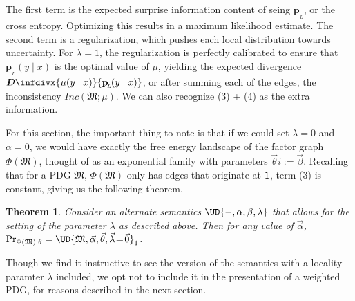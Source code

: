 \documentclass{article}
\theoremstyle{plain}
\newtheorem{theorem}{Theorem}[section]
\theoremstyle{definition}
\theoremstyle{remark}
\newcommand{\thickD}{I\mkern-8muD}
\newcommand{\kldiv}{\thickD\infdivx}%
\newcommand\mat[1]{\mathbf{#1}}
\newcommand{\bp}[1][L]{\mat{p}_{\!_{#1}\!}}
\newcommand{\dg}[1]{\mathfrak{#1}}
\newcommand\inco{\mathit{Inc}}
\numberwithin{equation}{section}
\begin{document}
	The first term is the expected surprise information content of seing $\bp$, or the cross entropy. Optimizing this results in a maximum likelihood estimate. The second term is a regularization, which pushes each local distribution towards uncertainty. For $\lambda = 1$, the regularization is perfectly calibrated to ensure that $\bp(y \mid x)$ is the optimal value of $\mu$, yielding the expected divergence $\kldiv{\mu(y\mid x)}{\bp(y\mid x)}$, or after summing each of the edges, the inconsistency $\inco(\dg M ; \mu)$. We can also recognize (3) + (4) as the extra information.
	
	For this section, the important thing to note is that if we could set $\lambda = 0$ and $\alpha = 0$, we would have exactly the free energy landscape of the factor graph $\Phi(\dg M)$, thought of as an exponential family with parameters $\vec \theta i:= \vec \beta$. Recalling that for a PDG $\dg M$, $\Phi(\dg M)$ only has edges that originate at $\sf 1$, term (3) is constant, giving us the following theorem.
	
	\begin{theorem}
		Consider an alternate semantics $\UD{-, \alpha, \beta, \lambda}$ that allows for the setting of the parameter $\lambda$ as described above. Then for any value of $\vec\alpha$, $\Pr_{\Phi(\dg M),\theta} = \UD{\dg M, \vec{\alpha}, \vec{\theta}, \vec\lambda \!=\! \vec 0 }_1$.
	\end{theorem}

	Though we find it instructive to see the version of the semantics with a locality paramter $\lambda$ included, we opt not to include it in the presentation of a weighted PDG, for reasons described in the next section.
	
\end{document}
